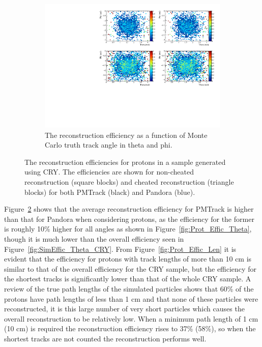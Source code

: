 \begin{figure}[h!]
\begin{subfigure}{.45\textwidth}
        \centering
        \includegraphics[width=\textwidth]{Effic_ProtonEnrich_500V_Proton_PhiTheta}
        \caption{The reconstruction efficiency as a function of Monte Carlo truth track angle in theta and phi.}
        \label{fig:Prot_Effic_PhiTheta}
  \end{subfigure}
  \caption[The reconstruction efficiencies for protons in a sample generated using CRY.]
          {The reconstruction efficiencies for protons in a sample generated using CRY. The efficiencies are shown for non-cheated reconstruction (square blocks) and cheated reconstruction (triangle blocks) for both PMTrack (black) and Pandora (blue).}
  \label{fig:Prot_Effic}
\end{figure}

Figure~\ref{fig:Prot_Effic} shows that the average reconstruction efficiency for PMTrack is higher than that for Pandora when considering protons, as the efficiency for the former is roughly 10\% higher for all angles as shown in Figure~\ref{fig:Prot_Effic_Theta}, though it is much lower than the overall efficiency seen in Figure~\ref{fig:SimEffic_Theta_CRY}. From Figure~\ref{fig:Prot_Effic_Len} it is evident that the efficiency for protons with track lengths of more than 10 cm is similar to that of the overall efficiency for the CRY sample, but the efficiency for the shortest tracks is significantly lower than that of the whole CRY sample. A review of the true path lengths of the simulated particles shows that 60\% of the protons have path lengths of less than 1 cm and that none of these particles were reconstructed, it is this large number of very short particles which causes the overall reconstruction to be relatively low. When a minimum path length of 1 cm (10 cm) is required the reconstruction efficiency rises to 37\% (58\%), so when the shortest tracks are not counted the reconstruction performs well. \\


